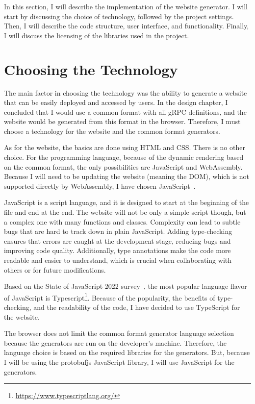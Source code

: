 In this section, I will describe the implementation of the website generator.
I will start by discussing the choice of technology, followed by the project settings.
Then, I will describe the code structure, user interface, and functionality.
Finally, I will discuss the licensing of the libraries used in the project.


\section{Choosing the Technology}
The main factor in choosing the technology was the ability to generate a website that can be easily deployed and accessed by users.
In the design chapter, I concluded that I would use a common format with all gRPC definitions, and the website would be generated from this format in the browser.
Therefore, I must choose a technology for the website and the common format generators.

As for the website, the basics are done using HTML and CSS\@.
There is no other choice.
For the programming language, because of the dynamic rendering based on the common format, the only possibilities are JavaScript and WebAssembly.
Because I will need to be updating the website (meaning the DOM), which is not supported directly by WebAssembly, I have chosen JavaScript~\cite{webassembly-dom}.

JavaScript is a script language, and it is designed to start at the beginning of the file and end at the end.
The website will not be only a simple script though, but a complex one with many functions and classes.
Complexity can lead to subtle bugs that are hard to track down in plain JavaScript.
Adding type-checking ensures that errors are caught at the development stage, reducing bugs and improving code quality.
Additionally, type annotations make the code more readable and easier to understand, which is crucial when collaborating with others or for future modifications.
\cite{typescript-why-create}

Based on the State of JavaScript 2022 survey~\cite{state-of-js-other-tools}, the most popular language flavor of JavaScript is Typescript\footnote{\url{https://www.typescriptlang.org/}}.
Because of the popularity, the benefits of type-checking, and the readability of the code, I have decided to use TypeScript for the website.

The browser does not limit the common format generator language selection because the generators are run on the developer's machine.
Therefore, the language choice is based on the required libraries for the generators.
But, because I will be using the protobufjs JavaScript library, I will use JavaScript for the generators.

